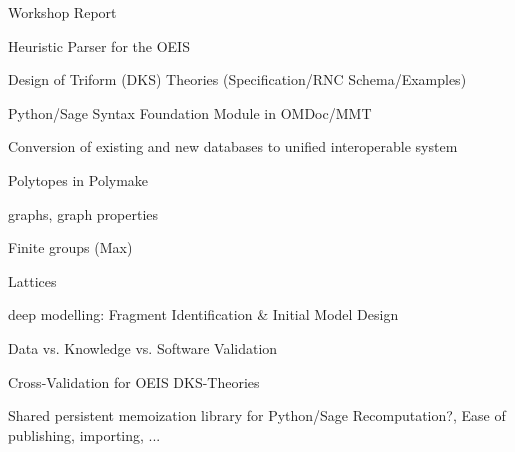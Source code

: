 \begin{workpackage}[id=dksbases,wphases=1-48!.5,
  title=Data/Knowledge/Software-Bases,lead=JU,
  ZHRM=12,JURM=36,USHRM=12,UWRM=25,SARM=10,LLRM=2,PSRM=4]
\begin{wpdelivs}
  \begin{wpdeliv}[due=9,id=wsrep,dissem=PU,nature=R,lead=JU]{Workshop Report}
  \end{wpdeliv}
  \begin{wpdeliv}[due=9,id=oeisparser,dissem=PU,nature=OTHER,lead=JU]
      {Heuristic Parser for the OEIS}
  \end{wpdeliv}
  \begin{wpdeliv}[due=12,id=dkstheories,dissem=PU,nature=R,lead=JU]
        {Design of Triform (DKS) Theories (Specification/RNC Schema/Examples)}
  \end{wpdeliv}
  \begin{wpdeliv}[due=12,id=pssyntax,dissem=PU,nature=DEC,lead=JU]
        {Python/Sage Syntax Foundation Module in OMDoc/MMT}
  \end{wpdeliv}
  \begin{wpdeliv}[due=12,id=conv,dissem=PU,nature=DEC,lead=ZH]
        {Conversion of existing and new databases to unified interoperable system}
     \begin{compactitem}
     \item Polytopes in Polymake
     \item graphs, graph properties
     \item Finite groups (Max)
     \item Lattices
     \end{compactitem}
   \end{wpdeliv}
  \begin{wpdeliv}[due=12,id=lfmmod,dissem=PU,nature=R,lead=ZH]
      {\LMFDB deep modelling: Fragment Identification \& Initial Model Design}
  \end{wpdeliv}
  \begin{wpdeliv}[due=18,id=lfmval,dissem=PU,nature=R,lead=ZH]
      {\LMFDB Data vs. Knowledge vs. Software Validation}
  \end{wpdeliv}
  \begin{wpdeliv}[due=18,id=oeisvalidation,dissem=PU,nature=R,lead=JU]
      {Cross-Validation for OEIS DKS-Theories}
  \end{wpdeliv}
  \begin{wpdeliv}[due=24,id=persistent-memoization,dissem=PU,nature=OTHER,lead=ZH]
    {Shared persistent memoization library for Python/Sage} 
    Recomputation?,  Ease of publishing, importing, ...
  \end{wpdeliv}
  \begin{wpdeliv}[due=24,id=dksimp,dissem=PU,nature=OTHER,lead=JU]

\end{wpdeliv}
\end{wpdelivs}
\end{workpackage}

